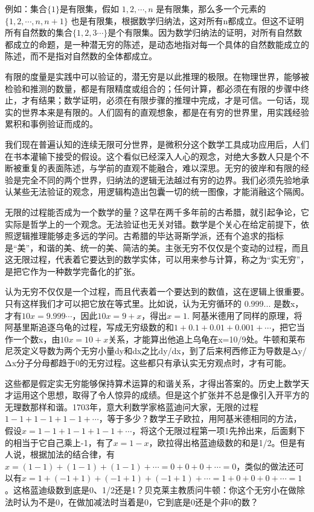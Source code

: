 \kaishu
\setlength{\leftskip}{1em}
例如：集合$ \{1\} $是有限集，假如 $ {1,2,\cdots,n} $ 是有限集，那么多一个元素的 $ \{1,2,\cdots,n,n+1\} $ 也是有限集，根据数学归纳法，这对所有n都成立。但这不证明所有自然数的集合$ \{1,2,3 \cdots\} $是个有限集。因为数学归纳法的证明，对所有自然数都成立的命题，是一种潜无穷的陈述，是动态地指对每一个具体的自然数能成立的陈述，而不是指对自然数的全体都成立。

\songti
\setlength{\leftskip}{0em}
有限的度量是实践中可以验证的，潜无穷是以此推理的极限。在物理世界，能够被检验和推测的数量，都是有限精度或组合的；任何计算，都必须在有限的步骤中终止，才有结果；数学证明，必须在有限步骤的推理中完成，才是可信。一句话，现实的世界本来是有限的。人们固有的直观想象，都是在有穷的世界里，用实践经验累积和事例验证而成的。

我们现在普遍认知的连续无限可分世界，是微积分这个数学工具成功应用后，人们在书本灌输下接受的假设。这个看似已经深入人心的观念，对绝大多数人只是个不断被重复的表面陈述，与学前的直观不能融合，难以深思。无穷的彼岸和有限的经验是完全不同的两个世界，归纳法的逻辑无法越过有穷的边界。我们必须先验地承认某些无法验证的观念，用逻辑构造出包囊一切的统一图像，才能消融这个隔阂。

无限的过程能否成为一个数学的量？这早在两千多年前的古希腊，就引起争论，它实际是哲学上的一个观念。无法验证也无关对错。数学是个关心在给定前提下，依照逻辑推理能够走多远的学问。古希腊的毕达哥斯学派，还有个追求的指标是“美”，和谐的美、统一的美、简洁的美。主张无穷不仅仅是个变动的过程，而且这无限过程，代表着它要达到的数学实体，可以用来参与计算，称之为“实无穷”，是把它作为一种数学完备化的扩张。

认为无穷不仅仅是一个过程，而且代表着一个要达到的数值，这在逻辑上很重要。只有这样我们才可以把它放在等式里。比如说，认为无穷循环的 $ 0.999... $ 是数x，才有$ 10x=9.999\cdots $，因此$ 10x = 9 + x $，得出$ x = 1 $. 阿基米德用了同样的原理，将阿基里斯追逐乌龟的过程，写成无穷级数的和$ 1+0.1+0.01+0.001+\cdots $，把它当作一个数x，由$ 10x=10+x $关系，才能算出他追上乌龟在x=10/9处。牛顿和莱布尼茨定义导数为两个无穷小量dy和dx之比dy/dx，到了后来柯西修正为导数是Δy/Δx分子分母都趋于0的无穷过程。这些都只有承认实无穷观点时，才有可能。

这些都是假定实无穷能够保持算术运算的和谐关系，才得出答案的。历史上数学天才运用这个思想，取得了令人惊异的成绩。但是这个扩张并不总是像引入开平方的无理数那样和谐。1703年，意大利数学家格蓝迪问大家，无限的过程$ 1-1+1-1+1-1+\cdots $，等于多少？数学王子欧拉，用阿基米德相同的方法，假设$ x=1-1+1-1+1-1+\cdots $，将这个无限过程第一项1先拎出来，后面剩下的相当于它自己乘上-1，有了$  x=1-x $，欧拉得出格蓝迪级数的和是1/2。但是有人说，根据加法的结合律，有$ x=(1-1)+(1-1)+(1-1)+\cdots=0+0+0+\cdots=0 $，类似的做法还可以有$ x=1+(-1+1)+(-1+1)+(-1+1)+\cdots=1+0+0+0+\cdots=1 $。这格蓝迪级数到底是0、1/2还是1？贝克莱主教质问牛顿：你这个无穷小在做除法时认为不是0，在做加减法时当着是0，它到底是0还是个非0的数？

